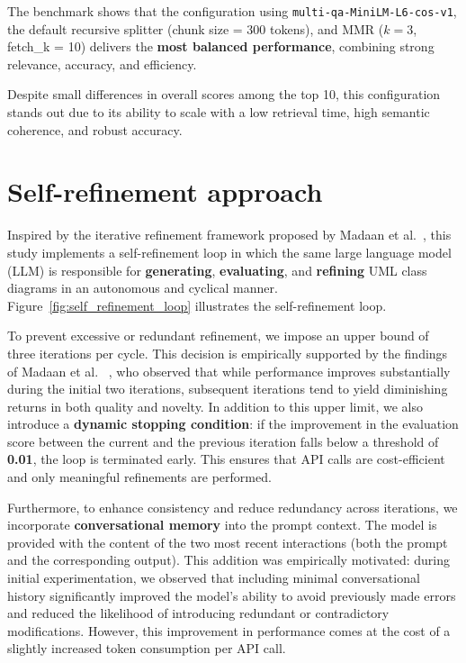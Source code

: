 The benchmark shows that the configuration using \texttt{multi-qa-MiniLM-L6-cos-v1}, the default recursive splitter (chunk size = 300 tokens), and MMR ($k = 3$, fetch\_k = 10) delivers the \textbf{most balanced performance}, combining strong relevance, accuracy, and efficiency.

Despite small differences in overall scores among the top 10, this configuration stands out due to its ability to scale with a low retrieval time, high semantic coherence, and robust accuracy.

\section{Self-refinement approach}
\label{sec:selfRefinementApproach}


Inspired by the iterative refinement framework proposed by Madaan et al.~\cite{madaan2023selfrefineiterativerefinementselffeedback}, this study implements a self-refinement loop in which the same large language model (LLM) is responsible for \textbf{generating}, \textbf{evaluating}, and \textbf{refining} UML class diagrams in an autonomous and cyclical manner. Figure~\ref{fig:self_refinement_loop} illustrates the self-refinement loop.

To prevent excessive or redundant refinement, we impose an upper bound of three iterations per cycle. This decision is empirically supported by the findings of Madaan et al. ~\cite{madaan2023selfrefineiterativerefinementselffeedback}, who observed that while performance improves substantially during the initial two iterations, subsequent iterations tend to yield diminishing returns in both quality and novelty. In addition to this upper limit, we also introduce a \textbf{dynamic stopping condition}: if the improvement in the evaluation score between the current and the previous iteration falls below a threshold of \textbf{0.01}, the loop is terminated early. This ensures that API calls are cost-efficient and only meaningful refinements are performed.

Furthermore, to enhance consistency and reduce redundancy across iterations, we incorporate \textbf{conversational memory} into the prompt context. The model is provided with the content of the two most recent interactions (both the prompt and the corresponding output). This addition was empirically motivated: during initial experimentation, we observed that including minimal conversational history significantly improved the model's ability to avoid previously made errors and reduced the likelihood of introducing redundant or contradictory modifications. However, this improvement in performance comes at the cost of a slightly increased token consumption per API call.

